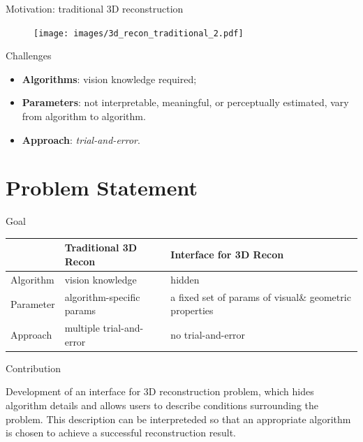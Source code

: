 \documentclass[10pt]{beamer}
\begin{document}
\begin{frame}{Motivation: traditional 3D reconstruction}

\begin{figure}
\centering
\texttt{[image: images/3d\_recon\_traditional\_2.pdf]}
\end{figure}

\begin{alertblock}{Challenges}
  \begin{itemize}
    \item \textbf{Algorithms}: vision knowledge required;
    \item \textbf{Parameters}: not interpretable, meaningful, or perceptually estimated, vary from algorithm to algorithm.
    \item \textbf{Approach}: \textit{trial-and-error}.
  \end{itemize}
\end{alertblock}

\end{frame}


\section{Problem Statement} %
\begin{frame}{Goal}

\begin{table}
\centering
\begin{tabular}{lp{3.5cm}p{4cm}}
& Traditional 3D Recon & Interface for 3D Recon\\
\midrule
Algorithm & vision knowledge & hidden \\
Parameter & algorithm-specific params & a fixed set of params of visual\& geometric properties \\
Approach & multiple trial-and-error & no trial-and-error \\
\end{tabular}
\end{table}

\end{frame}

\begin{frame}{Contribution}

Development of an interface for 3D reconstruction problem, which hides algorithm details and allows users to describe conditions surrounding the problem. This description can be interpreteded so that an appropriate algorithm is chosen to achieve a successful reconstruction result.

\end{frame}
\end{document}
